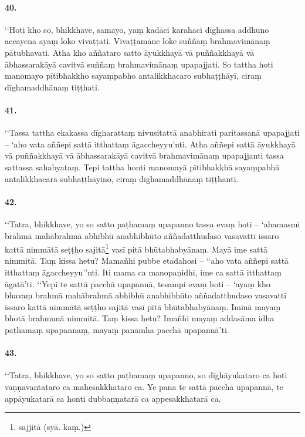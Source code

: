 \paragraph{40.}
‘‘Hoti kho so, bhikkhave, samayo, yaṃ kadāci karahaci dīghassa addhuno accayena ayaṃ loko vivaṭṭati. Vivaṭṭamāne loke suññaṃ brahmavimānaṃ pātubhavati. Atha kho aññataro satto āyukkhayā vā puññakkhayā vā ābhassarakāyā cavitvā suññaṃ brahmavimānaṃ upapajjati. So tattha hoti manomayo pītibhakkho sayaṃpabho antalikkhacaro subhaṭṭhāyī, ciraṃ dīghamaddhānaṃ tiṭṭhati.

\paragraph{41.}
‘‘Tassa tattha ekakassa dīgharattaṃ nivusitattā anabhirati paritassanā upapajjati – ‘aho vata aññepi sattā itthattaṃ āgaccheyyu’nti. Atha aññepi sattā āyukkhayā vā puññakkhayā vā ābhassarakāyā cavitvā brahmavimānaṃ upapajjanti tassa sattassa sahabyataṃ. Tepi tattha honti manomayā pītibhakkhā sayaṃpabhā antalikkhacarā subhaṭṭhāyino, ciraṃ dīghamaddhānaṃ tiṭṭhanti.

\paragraph{42.}
‘‘Tatra, bhikkhave, yo so satto paṭhamaṃ upapanno tassa evaṃ hoti – ‘ahamasmi brahmā mahābrahmā abhibhū anabhibhūto aññadatthudaso vasavattī issaro kattā nimmātā seṭṭho sajitā\footnote{sajjitā (syā. kaṃ.)} vasī pitā bhūtabhabyānaṃ. Mayā ime sattā nimmitā. Taṃ kissa hetu? Mamañhi pubbe etadahosi – ‘‘aho vata aññepi sattā itthattaṃ āgaccheyyu’’nti. Iti mama ca manopaṇidhi, ime ca sattā itthattaṃ āgatā’ti. ‘‘Yepi te sattā pacchā upapannā, tesampi evaṃ hoti – ‘ayaṃ kho bhavaṃ brahmā mahābrahmā abhibhū anabhibhūto aññadatthudaso vasavattī issaro kattā nimmātā seṭṭho sajitā vasī pitā bhūtabhabyānaṃ. Iminā mayaṃ bhotā brahmunā nimmitā. Taṃ kissa hetu? Imañhi mayaṃ addasāma idha paṭhamaṃ upapannaṃ, mayaṃ panamha pacchā upapannā’ti.

\paragraph{43.}
‘‘Tatra, bhikkhave, yo so satto paṭhamaṃ upapanno, so dīghāyukataro ca hoti vaṇṇavantataro ca mahesakkhataro ca. Ye pana te sattā pacchā upapannā, te appāyukatarā ca honti dubbaṇṇatarā ca appesakkhatarā ca.


